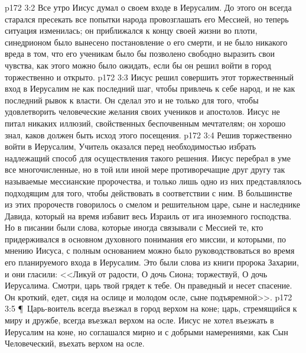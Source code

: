 \vs p172 3:2 Все утро Иисус думал о своем входе в Иерусалим. До этого он всегда старался пресекать все попытки народа провозглашать его Мессией, но теперь ситуация изменилась; он приближался к концу своей жизни во плоти, синедрионом было вынесено постановление о его смерти, и не было никакого вреда в том, что его ученикам было бы позволено свободно выразить свои чувства, как этого можно было ожидать, если бы он решил войти в город торжественно и открыто.
\vs p172 3:3 Иисус решил совершить этот торжественный вход в Иерусалим не как последний шаг, чтобы привлечь к себе народ, и не как последний рывок к власти. Он сделал это и не только для того, чтобы удовлетворить человеческие желания своих учеников и апостолов. Иисус не питал никаких иллюзий, свойственных беспочвенным мечтателям; он хорошо знал, каков должен быть исход этого посещения.
\vs p172 3:4 Решив торжественно войти в Иерусалим, Учитель оказался перед необходимостью избрать надлежащий способ для осуществления такого решения. Иисус перебрал в уме все многочисленные, но в той или иной мере противоречащие друг другу так называемые мессианские пророчества, и только лишь одно из них представлялось подходящим для того, чтобы действовать в соответствии с ним. В большинстве из этих пророчеств говорилось о смелом и решительном царе, сыне и наследнике Давида, который на время избавит весь Израиль от ига иноземного господства. Но в писании были слова, которые иногда связывали с Мессией те, кто придерживался в основном духовного понимания его миссии, и которыми, по мнению Иисуса, с полным основанием можно было руководствоваться во время его планируемого входа в Иерусалим. Это были слова из книги пророка Захарии, и они гласили: <<Ликуй от радости, О дочь Сиона; торжествуй, О дочь Иерусалима. Смотри, царь твой грядет к тебе. Он праведный и несет спасение. Он кроткий, едет, сидя на ослице и молодом осле, сыне подъяремной>>.
\vs p172 3:5 \P\ Царь\hyp{}воитель всегда въезжал в город верхом на коне; царь, стремящийся к миру и дружбе, всегда въезжал верхом на осле. Иисус не хотел въезжать в Иерусалим на коне, но соглашался мирно и с добрыми намерениями, как Сын Человеческий, въехать верхом на осле.

